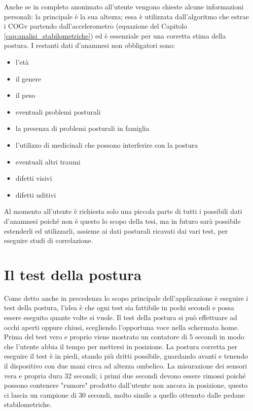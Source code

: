 Anche se in completo anonimato all'utente vengono chieste alcune informazioni personali: la principale è la sua altezza; essa è utilizzata dall'algoritmo che estrae i COGv partendo dall'accelerometro (equazione del Capitolo \ref{cap:analisi_stabilometriche}) ed è essenziale per una corretta stima della postura. I restanti dati d'anamnesi non obbligatori sono:
\begin{itemize}
  \item l'età
  \item il genere
  \item il peso
  \item eventuali problemi posturali
  \item la presenza di problemi posturali in famiglia
  \item l'utilizzo di medicinali che possono interferire con la postura
  \item eventuali altri traumi
  \item difetti visivi
  \item difetti uditivi
\end{itemize}

Al momento all'utente è richiesta solo una piccola parte di tutti i possibili dati d'anamnesi poiché non è questo lo scopo della tesi, ma in futuro sarà possibile estenderli ed utilizzarli, assieme ai dati posturali ricavati dai vari test, per eseguire studi di correlazione.

\section{Il test della postura}
Come detto anche in precedenza lo scopo principale dell'applicazione è eseguire i test della postura, l'idea è che ogni test sia fattibile in pochi secondi e possa essere eseguito quante volte si vuole. Il test della postura si può effettuare ad occhi aperti oppure chiusi, scegliendo l'opportuna voce nella schermata home. Prima del test vero e proprio viene mostrato un contatore di 5 secondi in modo che l'utente abbia il tempo per mettersi in posizione. La postura corretta per eseguire il test è in piedi, stando più dritti possibile, guardando avanti e tenendo il dispositivo con due mani circa ad altezza ombelico.
La misurazione dei sensori vera e propria dura 32 secondi; i primi due secondi devono essere rimossi poiché possono contenere "rumore" prodotto dall'utente non ancora in posizione, questo ci lascia un campione di 30 secondi, molto simile a quello ottenuto dalle pedane stabilometriche.


